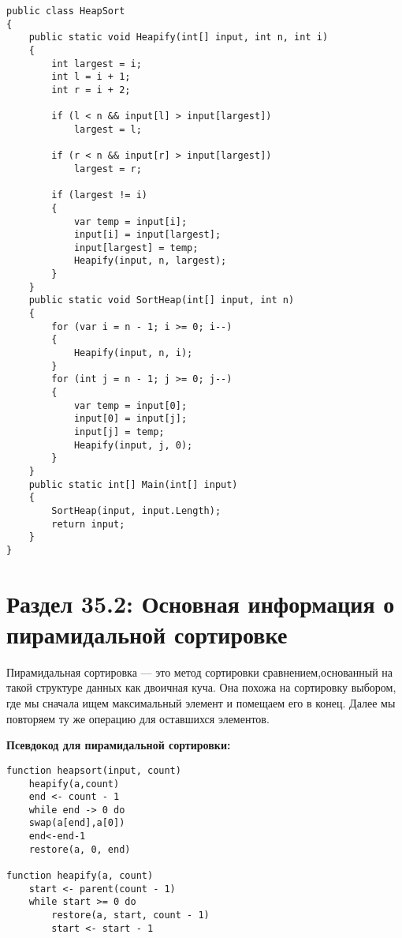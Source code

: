 \vspace{\baselineskip}
\begin{tcolorbox}
\begin{verbatim} 
public class HeapSort
{
    public static void Heapify(int[] input, int n, int i)
    {
        int largest = i;
        int l = i + 1;
        int r = i + 2;
        
        if (l < n && input[l] > input[largest])
            largest = l;
            
        if (r < n && input[r] > input[largest])
            largest = r;
            
        if (largest != i)
        {
            var temp = input[i];
            input[i] = input[largest];
            input[largest] = temp;
            Heapify(input, n, largest);
        }
    }
    public static void SortHeap(int[] input, int n)
    {
        for (var i = n - 1; i >= 0; i--)
        {
            Heapify(input, n, i);
        }
        for (int j = n - 1; j >= 0; j--)
        {
            var temp = input[0];
            input[0] = input[j];
            input[j] = temp;
            Heapify(input, j, 0);
        }
    }
    public static int[] Main(int[] input)
    {
        SortHeap(input, input.Length);
        return input;
    }
}
\end{verbatim}
\end{tcolorbox}

\section*{Раздел 35.2: Основная информация о пирамидальной
сортировке} 

\vspace{\baselineskip}
Пирамидальная сортировка — это метод сортировки сравнением,основанный на такой структуре данных как двоичная куча. Она похожа на сортировку выбором, где мы сначала ищем максимальный элемент и помещаем его в конец. Далее мы повторяем ту же операцию для оставшихся элементов.

\vspace{\baselineskip}
\textbf{Псевдокод для пирамидальной сортировки:}

\vspace{\baselineskip}
\begin{tcolorbox}
\begin{verbatim} 
function heapsort(input, count)
    heapify(a,count)
    end <- count - 1
    while end -> 0 do
    swap(a[end],a[0])
    end<-end-1
    restore(a, 0, end)
    
function heapify(a, count)
    start <- parent(count - 1)
    while start >= 0 do
        restore(a, start, count - 1)
        start <- start - 1

\end{verbatim}
\end{tcolorbox}

